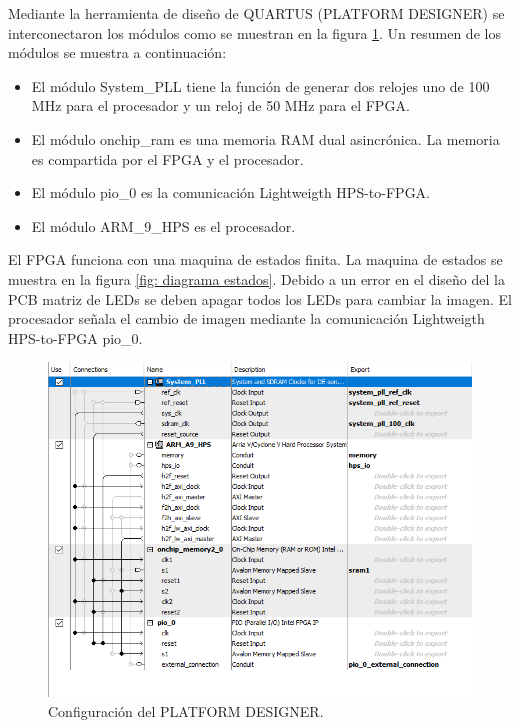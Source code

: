 Mediante la herramienta de diseño de QUARTUS (PLATFORM DESIGNER) se interconectaron los módulos como se muestran en la figura \ref{fig: platform}. Un resumen de los módulos se muestra a continuación:
\begin{itemize}
\item El módulo System\_PLL tiene la función de generar dos relojes uno de 100 MHz para el procesador y un reloj de 50 MHz para el FPGA.
\item El módulo onchip\_ram es una memoria RAM dual asincrónica. La memoria es compartida por el FPGA y el procesador. 
\item El módulo pio\_0 es la comunicación Lightweigth HPS-to-FPGA. 
\item El módulo ARM\_9\_HPS es el procesador. 
\end{itemize}

El FPGA funciona con una maquina de estados finita. La maquina de estados se muestra en la figura \ref{fig: diagrama estados}. Debido a un error en el diseño del la PCB matriz de LEDs se deben apagar todos los LEDs para cambiar la imagen. El procesador señala el cambio de imagen mediante la comunicación Lightweigth HPS-to-FPGA pio\_0.

 



\begin{figure}[htpb]
	\centering
	\includegraphics[scale=0.8]{Figures/platformdesigner.png} 
	\caption{Configuración del PLATFORM DESIGNER.}
	\label{fig: platform}
\end{figure}


